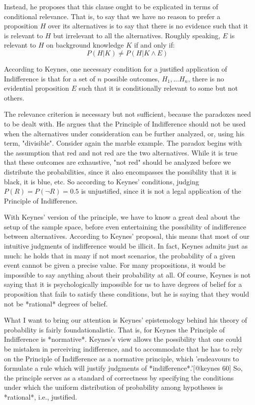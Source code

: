 Instead, he proposes that this clause ought to be explicated in terms of
conditional relevance. That is, to say that we have no reason to prefer
a proposition \(H\) over its alternatives is to say that there is no
evidence such that it is relevant to \(H\) but irrelevant to all the
alternatives. Roughly speaking, \(E\) is relevant to \(H\) on background
knowledge \(K\) if and only if: \[P(H|K) \neq P(H|K\wedge E)\]

According to Keynes, one necessary condition for a justified application
of Indifference is that for a set of \(n\) possible outcomes,
\(H_1,...H_n\), there is no evidential proposition \(E\) such that it is
conditionally relevant to some but not others.

The relevance criterion is necessary but not sufficient, because the
paradoxes need to be dealt with. He argues that the Principle of
Indifference should not be used when the alternatives under
consideration can be further analyzed, or, using his term, "divisible".
Consider again the marble example. The paradox begins with the
assumption that red and not red are the two alternatives. While it is
true that these outcomes are exhaustive, "not red" should be analyzed
before we distribute the probabilities, since it also encompasses the
possibility that it is black, it is blue, etc. So according to Keynes'
conditions, judging \(P(R) = P(\neg R) = 0.5\) is unjustified, since it
is not a legal application of the Principle of Indifference.

With Keynes' version of the principle, we have to know a great deal
about the setup of the sample space, before even entertaining the
possibility of indifference between alternatives. According to Keynes'
proposal, this means that most of our intuitive judgments of
indifference would be illicit. In fact, Keynes admits just as much: he
holds that in many if not most scenarios, the probability of a given
event cannot be given a precise value. For many propositions, it would
be impossible to say anything about their probability at all. Of course,
Keynes is not saying that it is psychologically impossible for us to
have degrees of belief for a proposition that fails to satisfy these
conditions, but he is saying that they would not be *rational* degrees
of belief.

What I want to bring our attention is Keynes' epistemology behind his
theory of probability is fairly foundationalistic. That is, for Keynes
the Principle of Indifference is *normative*. Keynes's view allows the
possibility that one could be mistaken in perceiving indifference, and
to accommodate that he has to rely on the Principle of Indifference as a
normative principle, which 'endeavours to formulate a rule which will
justify judgments of *indifference*.'{[}@keynes 60{]} So, the principle
serves as a standard of correctness by specifying the conditions under
which the uniform distribution of probability among hypotheses is
*rational*, i.e., justified.

